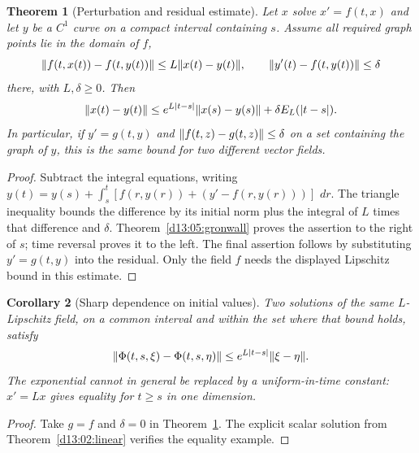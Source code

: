 \documentclass[11pt,oneside]{book}
\newtheorem{theorem}{Theorem}[chapter]
\newtheorem{corollary}[theorem]{Corollary}
\theoremstyle{definition}
\theoremstyle{remark}\newtheorem{remark}[theorem]{Remark}
\newcommand{\dd}{\,d}\newcommand{\id}{\operatorname{id}}
\begin{document}
\begin{theorem}[Perturbation and residual estimate]\label{d13:05:perturbation}
Let $x$ solve $x'=f(t,x)$ and let $y$ be a $C^1$ curve on a compact
interval containing $s$. Assume all required graph points lie in the
domain of $f$,
\[
 \lVert f(t,x(t))-f(t,y(t))\rVert\leq L\lVert x(t)-y(t)\rVert,\qquad
 \lVert y'(t)-f(t,y(t))\rVert\leq\delta
\]
there, with $L,\delta\geq0$. Then
\[
 \lVert x(t)-y(t)\rVert\leq
 e^{L|t-s|}\lVert x(s)-y(s)\rVert+\delta E_L(|t-s|).
\]
In particular, if $y'=g(t,y)$ and $\lVert f(t,z)-g(t,z)\rVert\leq\delta$
on a set containing the graph of $y$, this is the same bound for two
different vector fields.
\end{theorem}
\begin{proof}
Subtract the integral equations, writing
$y(t)=y(s)+\int_s^t[f(r,y(r))+(y'-f(r,y(r)))]\,\dd r$.
The triangle inequality bounds the difference by its initial norm plus
the integral of $L$ times that difference and $\delta$.
Theorem~\ref{d13:05:gronwall} proves the assertion to the right of $s$;
time reversal proves it to the left. The final assertion follows by
substituting $y'=g(t,y)$ into the residual. Only the field $f$ needs
the displayed Lipschitz bound in this estimate.
\end{proof}

\begin{corollary}[Sharp dependence on initial values]\label{d13:05:initial-bound}
Two solutions of the same $L$-Lipschitz field, on a common interval and
within the set where that bound holds, satisfy
\[
 \lVert\Phi(t,s,\xi)-\Phi(t,s,\eta)\rVert
       \leq e^{L|t-s|}\lVert\xi-\eta\rVert.
\]
The exponential cannot in general be replaced by a uniform-in-time
constant: $x'=Lx$ gives equality for $t\geq s$ in one dimension.
\end{corollary}
\begin{proof}
Take $g=f$ and $\delta=0$ in
Theorem~\ref{d13:05:perturbation}. The explicit scalar solution from
Theorem~\ref{d13:02:linear} verifies the equality example.
\end{proof}
\end{document}
